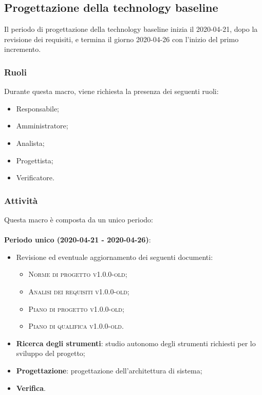 \documentclass[../piano-di-progetto.tex]{subfiles}
\begin{document}
\subsection{Progettazione della technology baseline}
Il periodo di progettazione della technology baseline inizia il 2020-04-21, dopo la revisione dei requisiti, e termina il giorno 2020-04-26 con l'inizio del primo incremento. 

\subsubsection{Ruoli}
Durante questa macro, viene richiesta la presenza dei seguenti ruoli:
\begin{itemize}
    \item Responsabile;
    \item Amministratore;
    \item Analista;
    \item Progettista;
    \item Verificatore.
\end{itemize}

\subsubsection{Attività}
Questa macro è composta da un unico periodo:
\\
\\
\textbf{Periodo unico (2020-04-21 - 2020-04-26)}:
        \begin{itemize}
            \item Revisione ed eventuale aggiornamento dei seguenti documenti:
            \begin{itemize}
                \item \textsc{Norme di progetto v1.0.0-old};
                \item \textsc{Analisi dei requisiti v1.0.0-old};
                \item \textsc{Piano di progetto v1.0.0-old};
                \item \textsc{Piano di qualifica v1.0.0-old}.
            \end{itemize}

            \item \textbf{Ricerca degli strumenti}: studio autonomo degli strumenti richiesti per lo sviluppo del progetto; 
            \item \textbf{Progettazione}: progettazione dell'architettura di sistema;
            \item \textbf{Verifica}.
        \end{itemize}
    
\end{document}
